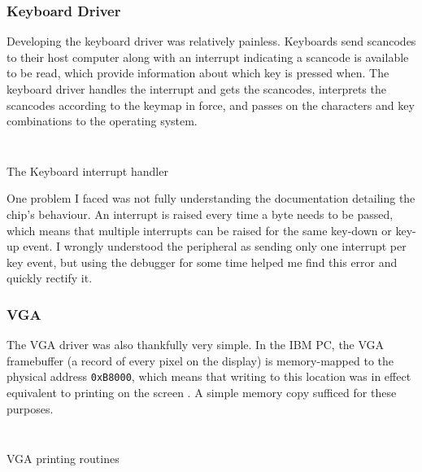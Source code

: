 \documentclass[a4paper,12pt]{article}
\begin{document}
\subsubsection{Keyboard Driver}
Developing the keyboard driver was relatively painless. Keyboards send scancodes to their host computer along with an interrupt indicating a scancode is available to be read, which provide information about which key is pressed when. The keyboard driver handles the interrupt and gets the scancodes, interprets the scancodes according to the keymap in force, and passes on the characters and key combinations to the operating system. 

\begin{listing}[H]
\ifwindows
\inputminted[breaklines, linenos, numbersep=5pt, firstline=10, lastline=55]{gas}{/home/vedantg/os/kernel/hw/i8042/i8042_isr.s} %
\else
\inputminted[breaklines, linenos, numbersep=5pt, firstline=10, lastline=55]{gas}{/home/vedantg/os/kernel/hw/i8042/i8042_isr.s} %
\fi
\caption{The Keyboard interrupt handler}
\label{listing:keyboard}
\end{listing}

One problem I faced was not fully understanding the documentation detailing the chip's behaviour. An interrupt is raised every time a byte needs to be passed, which means that multiple interrupts can be raised for the same key-down or key-up event. I wrongly understood the peripheral as sending only one interrupt per key event, but using the debugger for some time helped me find this error and quickly rectify it. 

\subsubsection{VGA}
The VGA driver was also thankfully very simple. In the IBM PC, the VGA framebuffer (a record of every pixel on the display) is memory-mapped to the physical address \texttt{0xB8000}, which means that writing to this location was in effect equivalent to printing on the screen \citep{ibmpc_reference}. A simple memory copy sufficed for these purposes. 
\begin{listing}[H]
\ifwindows
\inputminted[breaklines, linenos, numbersep=5pt, firstline=53, lastline=58]{c}{/home/vedantg/os/kernel/hw/vga/vga.c} %
\else
\inputminted[breaklines, linenos, numbersep=5pt, firstline=53, lastline=58]{c}{/home/vedantg/os/kernel/hw/vga/vga.c} %
\fi
\caption{VGA printing routines}
\label{listing:vga}
\end{listing}
\end{document}
